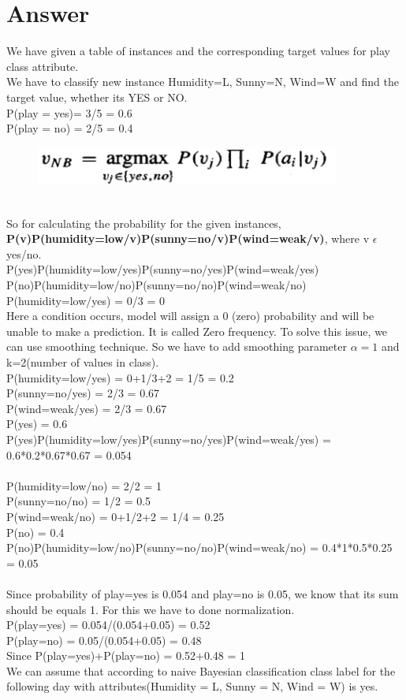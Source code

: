 \section*{Answer}
We have given a table of instances and the corresponding target values for play class attribute.\\
We have to classify new instance {Humidity=L, Sunny=N, Wind=W} and find the target value, whether its YES or NO.\\
P(play = yes)= 3/5 = 0.6\\
P(play = no) = 2/5 = 0.4\\
\begin{figure}[htp]
    \centering
    \includegraphics[width=10cm]{images/A11_img2.png}
\end{figure}\\
So for calculating the probability for the given instances,\\
\textbf{P(v)P(humidity=low/v)P(sunny=no/v)P(wind=weak/v)}, where v $\epsilon$ {yes/no}.\\
P(yes)P(humidity=low/yes)P(sunny=no/yes)P(wind=weak/yes)\\
P(no)P(humidity=low/no)P(sunny=no/no)P(wind=weak/no)\\
P(humidity=low/yes) = 0/3 = 0\\
Here a condition occurs, model will assign a 0 (zero) probability and will be unable to make a prediction. It is called Zero frequency. To solve this issue, we can use smoothing technique. So we have to add smoothing parameter $\alpha=1$ and k=2(number of values in class).\\
P(humidity=low/yes) = 0+1/3+2 = 1/5 = 0.2\\
P(sunny=no/yes) = 2/3 = 0.67\\
P(wind=weak/yes) = 2/3 = 0.67\\
P(yes) = 0.6\\
P(yes)P(humidity=low/yes)P(sunny=no/yes)P(wind=weak/yes) = 0.6*0.2*0.67*0.67 = 0.054\\\\
P(humidity=low/no) = 2/2 = 1\\
P(sunny=no/no) = 1/2 = 0.5\\
P(wind=weak/no) = 0+1/2+2 = 1/4 = 0.25\\
P(no) = 0.4\\
P(no)P(humidity=low/no)P(sunny=no/no)P(wind=weak/no) = 0.4*1*0.5*0.25 = 0.05\\\\
Since probability of play=yes is 0.054 and play=no is 0.05, we know that its sum should be equals 1. For this we have to done normalization.\\
P(play=yes) = 0.054/(0.054+0.05) = 0.52\\
P(play=no) = 0.05/(0.054+0.05) = 0.48\\
Since P(play=yes)+P(play=no) = 0.52+0.48 = 1\\
We can assume that according to naive Bayesian classification class label for the following day with attributes(Humidity = L, Sunny = N, Wind = W) is yes.\\

